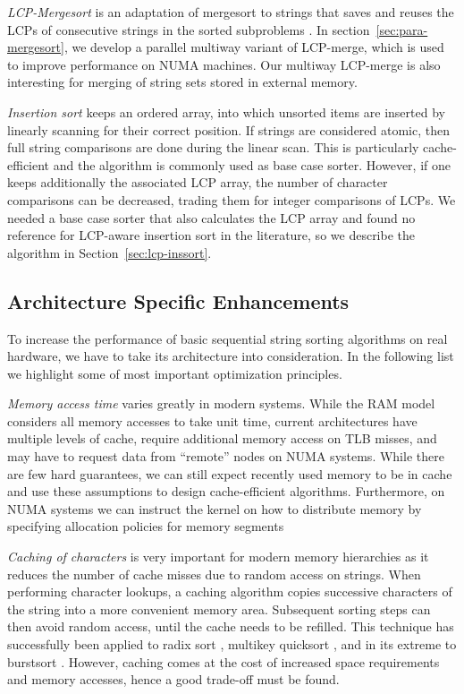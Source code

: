 \documentclass[a4paper]{myjournal}
\begin{document}
\emph{LCP-Mergesort} is an adaptation of mergesort to strings that saves and
reuses the LCPs of consecutive strings in the sorted subproblems
\cite{ng2008merging}. In section~\ref{sec:para-mergesort}, we develop a parallel
multiway variant of LCP-merge, which is used to improve performance on NUMA
machines. Our multiway LCP-merge is also interesting for merging of
string sets stored in external memory.

\emph{Insertion sort} \cite{knuth1998sorting} keeps an ordered array, into which
unsorted items are inserted by linearly scanning for their correct position. If
strings are considered atomic, then full string comparisons are done during the
linear scan. This is particularly cache-efficient and the algorithm is commonly
used as base case sorter.  However, if one keeps additionally the associated LCP
array, the number of character comparisons can be decreased, trading them for
integer comparisons of LCPs. We needed a base case sorter that also calculates
the LCP array and found no reference for LCP-aware insertion sort in the
literature, so we describe the algorithm in Section~\ref{sec:lcp-inssort}.

\subsection{Architecture Specific Enhancements}

To increase the performance of basic sequential string sorting algorithms on
real hardware, we have to take its architecture into consideration.  In the
following list we highlight some of most important optimization principles.

\emph{Memory access time} varies greatly in modern systems.  While the RAM model
considers all memory accesses to take unit time, current architectures have
multiple levels of cache, require additional memory access on TLB misses, and
may have to request data from ``remote'' nodes on NUMA systems.  While there are
few hard guarantees, we can still expect recently used memory to be in cache and
use these assumptions to design cache-efficient algorithms.  Furthermore, on
NUMA systems we can instruct the kernel on how to distribute memory by
specifying allocation policies for memory segments

\emph{Caching of characters} is very important for modern memory hierarchies as
it reduces the number of cache misses due to random access on strings.  When
performing character lookups, a caching algorithm copies successive characters
of the string into a more convenient memory area.  Subsequent sorting steps can
then avoid random access, until the cache needs to be refilled.  This technique
has successfully been applied to radix sort \cite{ng2007cache}, multikey
quicksort \cite{rantala2007web}, and in its extreme to burstsort
\cite{sinha2007cache-efficient}. However, caching comes at the cost of increased
space requirements and memory accesses, hence a good trade-off must be found.
\end{document}

